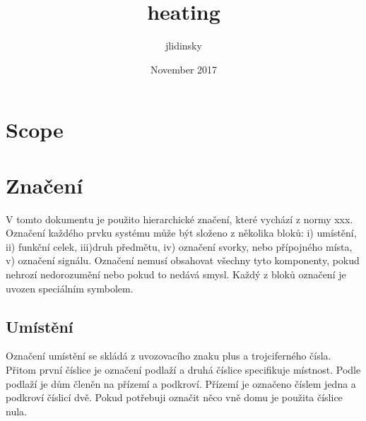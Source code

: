 \documentclass{book}
\title{heating}
\author{jlidinsky }
\date{November 2017}
\begin{document}
\maketitle

\chapter*{Scope}

\chapter{Značení}

    V tomto dokumentu je použito hierarchické značení, které vychází z normy
    xxx. Označení každého prvku systému může být složeno z několika bloků:
    i) umístění, ii) funkční celek, iii)druh předmětu, iv) označení svorky, 
    nebo přípojného místa, v) označení signálu. Označení nemusí obsahovat
    všechny tyto komponenty, pokud nehrozí nedorozumění nebo pokud to nedává
    smysl. Každý z bloků označení je uvozen speciálním symbolem.

\section{Umístění}

    Označení umístění se skládá z uvozovacího znaku plus a trojciferného čísla.
    Přitom první číslice je označení podlaží a druhá číslice specifikuje
    místnost. Podle podlaží je dům členěn na přízemí a podkroví. Přízemí
    je označeno číslem jedna a podkroví číslicí dvě. Pokud potřebuji označit
    něco vně domu je použita číslice nula.
\end{document}
